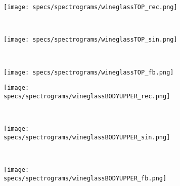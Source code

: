 \begin{figure}[H]
    \centering
    \begin{subfigure}[b]{0.25\textwidth}
        \texttt{[image: specs/spectrograms/wineglassTOP\_rec.png]}
    \end{subfigure}%
    ~ %
    \begin{subfigure}[b]{0.25\textwidth}
        \texttt{[image: specs/spectrograms/wineglassTOP\_sin.png]}
    \end{subfigure}%
    ~ %
    \begin{subfigure}[b]{0.25\textwidth}
        \texttt{[image: specs/spectrograms/wineglassTOP\_fb.png]}
    \end{subfigure}%
      
    \begin{subfigure}[b]{0.25\textwidth}
        \texttt{[image: specs/spectrograms/wineglassBODYUPPER\_rec.png]}
    \end{subfigure}%
    ~ %
    \begin{subfigure}[b]{0.25\textwidth}
        \texttt{[image: specs/spectrograms/wineglassBODYUPPER\_sin.png]}
    \end{subfigure}%
    ~ %
    \begin{subfigure}[b]{0.25\textwidth}
        \texttt{[image: specs/spectrograms/wineglassBODYUPPER\_fb.png]}
    \end{subfigure}%
    \end{figure}
